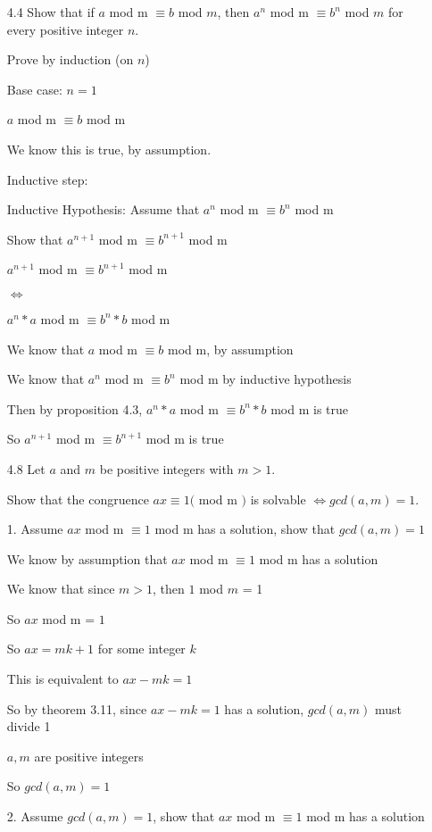 \documentclass[11pt]{article}
\begin{document}
\begin{itemize}


\item[4.4] Show that if $a $ mod m $ \equiv b$ mod $m$, then $a^n $ mod m $ \equiv b^n$ mod $m$ for every positive integer $n$.

Prove by induction (on $n$)

Base case: $n = 1$

$a$ mod m $ \equiv b $ mod m

We know this is true, by assumption.

Inductive step:

Inductive Hypothesis: Assume that $a^n $ mod m $ \equiv b^n $ mod m

Show that $a^{n+1} $ mod m $ \equiv b^{n+1} $ mod m

$a^{n+1}$ mod m $ \equiv b^{n+1} $ mod m

$\iff$ %

$a^{n} * a $ mod m $ \equiv b^{n} * b $ mod m

We know that $a $ mod m $ \equiv b $ mod m, by assumption

We know that $a^n $ mod m $ \equiv b^n $ mod m by inductive hypothesis

Then by proposition 4.3, $a^{n} * a $ mod m $ \equiv b^{n} * b $ mod m is true

So $a^{n+1} $ mod m $ \equiv b^{n+1} $ mod m is true

\item[4.8]
Let $a$ and $m$ be positive integers with $m > 1$. 

Show that the congruence $ax \equiv 1 ($ mod m $)$ is solvable $\iff gcd(a,m) = 1$.

1. Assume $ax$ mod m $\equiv 1 $ mod m has a solution, show that $gcd(a,m) = 1$

We know by assumption that $ax$ mod m $\equiv 1$ mod m has a solution

We know that since $m > 1$, then $1$ mod $m$ = 1

So $ax$ mod m = $1$

So $ax = mk + 1$ for some integer $k$

This is equivalent to $ax - mk = 1$

So by theorem 3.11, since $ax - mk = 1$ has a solution, $gcd(a,m)$ must divide 1

$a, m$ are positive integers

So $gcd(a,m) = 1$

2. Assume $gcd(a,m) = 1$, show that $ax$ mod m $\equiv 1$ mod m has a solution


\end{itemize}
\end{document}
